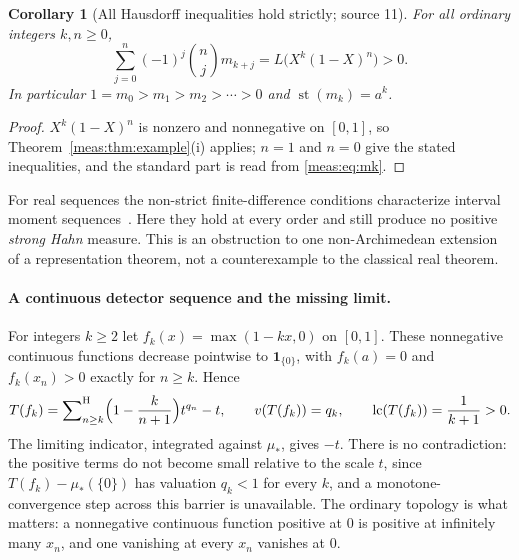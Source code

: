 \documentclass[11pt]{article}
\numberwithin{equation}{section}
\newtheorem{corollary}[theorem]{Corollary}
\theoremstyle{definition}
\theoremstyle{remark}
\newcommand{\st}{\operatorname{st}}
\newcommand{\lc}{\operatorname{lc}}
\newcommand{\ind}{\mathbf 1}
\newcommand{\hsum}{\mathop{\sum}\nolimits^{\mathrm H}}
\begin{document}
\begin{corollary}[All Hausdorff inequalities hold strictly; source 11]
\label{meas:cor:hausdorff}
For all ordinary integers $k,n\ge0$,
\begin{equation}\label{meas:eq:hausdorff}
 \sum_{j=0}^{n}(-1)^j\binom nj m_{k+j}=L\bigl(X^k(1-X)^n\bigr)>0.
\end{equation}
In particular $1=m_0>m_1>m_2>\cdots>0$ and $\st(m_k)=a^k$.
\end{corollary}
\begin{proof}
$X^k(1-X)^n$ is nonzero and nonnegative on $[0,1]$, so
Theorem~\ref{meas:thm:example}(i) applies; $n=1$ and $n=0$ give the stated
inequalities, and the standard part is read from \eqref{meas:eq:mk}.
\end{proof}

For real sequences the non-strict finite-difference conditions characterize
interval moment sequences~\cite{Schmudgen}. Here they hold at every order and
still produce no positive \emph{strong Hahn} measure. This is an obstruction to
one non-Archimedean extension of a representation theorem, not a counterexample
to the classical real theorem.

\paragraph{A continuous detector sequence and the missing limit.} For integers
$k\ge2$ let $f_k(x)=\max(1-kx,0)$ on $[0,1]$. These nonnegative continuous
functions decrease pointwise to $\ind_{\{0\}}$, with $f_k(a)=0$ and $f_k(x_n)>0$
exactly for $n\ge k$. Hence
\begin{equation}\label{meas:eq:tent}
 T(f_k)=\hsum_{n\ge k}\Bigl(1-\frac k{n+1}\Bigr)t^{q_n}-t,\qquad
 v(T(f_k))=q_k,\qquad \lc(T(f_k))=\frac1{k+1}>0.
\end{equation}
The limiting indicator, integrated against $\mu_*$, gives $-t$. There is no
contradiction: the positive terms do not become small relative to the scale
$t$, since $T(f_k)-\mu_*(\{0\})$ has valuation $q_k<1$ for every $k$, and a
monotone-convergence step across this barrier is unavailable. The ordinary
topology is what matters: a nonnegative continuous function positive at $0$ is
positive at infinitely many $x_n$, and one vanishing at every $x_n$ vanishes at
$0$.
\end{document}
